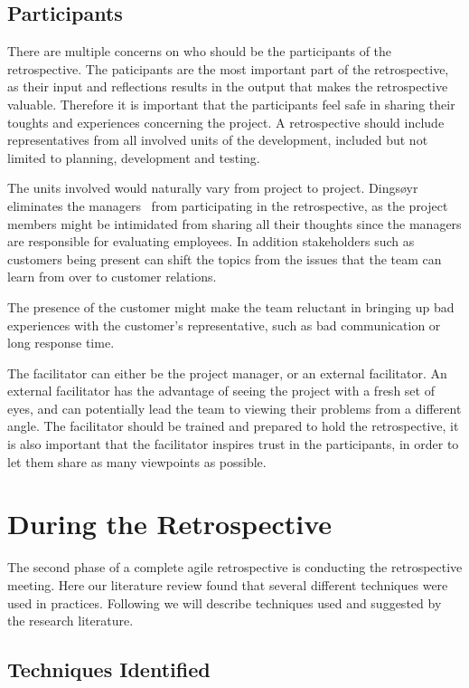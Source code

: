 \documentclass[12pt]{article}
\begin{document}
\subsection{Participants}
There are multiple concerns on who should be the participants of the retrospective.  The paticipants are the most important part of the retrospective, as their input and reflections results in the output that makes the retrospective valuable. Therefore it is important that the participants feel safe in sharing their toughts and experiences concerning the project. A retrospective should include representatives from all involved units of the development, included but not limited to planning, development and testing. 

The units involved would naturally vary from project to project. Dingsøyr eliminates the managers~\cite{Dingsoyr2005} from participating in the retrospective, as the project members might be intimidated from sharing all their thoughts since the managers are responsible for evaluating employees. In addition stakeholders such as customers being present can shift the topics from the issues that the team can learn from over to customer relations. 

The presence of the customer might make the team reluctant in bringing up bad experiences with the customer's representative, such as bad communication or long response time. 

The facilitator can either be the project manager, or an external facilitator. An external facilitator has the advantage of seeing the project with a fresh set of eyes, and can potentially lead the team to viewing their problems from a different angle. The facilitator should be trained and prepared to hold the retrospective, it is also important that the facilitator inspires trust in the participants, in order to let them share as many viewpoints as possible.

\section{During the Retrospective}
The second phase of a complete agile retrospective is conducting the retrospective meeting. Here our literature review found that several different techniques were used in practices. Following we will describe techniques used and suggested by the research literature.

\subsection{Techniques Identified} \label{subsec:technqiues-identified}
\end{document}
